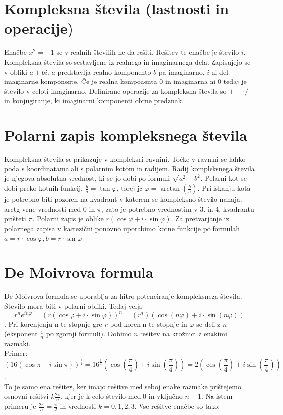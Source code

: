 \documentclass[12pt]{report}
\begin{document}
\section*{Kompleksna števila (lastnosti in operacije)}
Enačbe $x^{2}=-1$ se v realnih številih ne da rešiti. Rešitev te enačbe je število $i$. Kompleksna števila so sestavljene iz realnega in imaginarnega dela. Zapisujejo se v obliki $a+bi$. $a$ predstavlja realno komponento $b$ pa imaginarno. $i$ ni del imaginarne komponente. Če je realna komponenta $0$ in imaginarna ni $0$ tedaj je število v celoti imaginarno. Definirane operacije za kompleksna števila so $+ - \cdot /$ in konjugiranje, ki imaginarni komponenti obrne predznak.

\section*{Polarni zapis kompleksnega števila}
Kompleksna števila se prikazuje v kompleksni ravnini. Točke v ravnini se lahko poda s koordinatama ali s polarnim kotom in radijem. Radij kompleksnega števila je njegova absolutna vrednost, ki se jo dobi po formuli $\sqrt{a^{2}+b^{2}}$. Polarni kot se dobi preko kotnih funkcij. $\frac{b}{a} = \tan\varphi$, torej je $\varphi=\arctan(\frac{b}{a})$. Pri iskanju kota je potrebno biti pozoren na kvadrant v katerem se kompleksno število nahaja. arctg vrne vrednosti med $0$ in $\pi$, zato je potrebno vrednostim v 3. in 4. kvadrantu prišteti $\pi$. Polarni zapis je oblike $r(\cos\varphi + i\cdot \sin\varphi)$. Za pretvarjanje iz polarnega zapisa v kartezični ponovno uporabimo kotne funkcije po formulah $a=r\cdot \cos\varphi, b=r \cdot \sin\varphi$

\section*{De Moivrova formula}
De Moivrova formula se uporablja za hitro potenciranje kompleksnega števila. Število mora biti v polarni obliki. Tedaj velja 
\[r^ne^{in\varphi}=(r(\cos\varphi + i \cdot \sin\varphi))^{n}=(r^{n})(\cos(n\varphi) + i \cdot \sin(n\varphi))\]. 
\bigbreak
Pri korenjenju n-te stopnje gre $r$ pod koren n-te stopnje in $\varphi$ se deli z $n$ (eksponent $\frac{1}{n}$ po zgornji formuli). Dobimo $n$ rešitev na krožnici z enakimi razmaki.\\
\bigbreak
Primer: \[(16(\cos\pi + i \sin\pi))^{\frac{1}{4}} = 16^{\frac{1}{4}}(\cos(\frac{\pi}{4}) + i\sin(\frac{\pi}{4})) =  2(\cos(\frac{\pi}{4})+i\sin(\frac{\pi}{4}))\].\\ 
\bigbreak
To je samo ena rešitev, ker imajo rešitve med seboj enake razmake prištejemo osnovni rešitvi $k\frac{2\pi}{n}$, kjer je k celo število med 0 in vključno $n-1$. Na istem primeru je $\frac{2\pi}{n}=\frac{\pi}{2}$ in vrednosti $k = {0, 1, 2, 3}$. Vse rešitve enačbe so tako:
\end{document}
